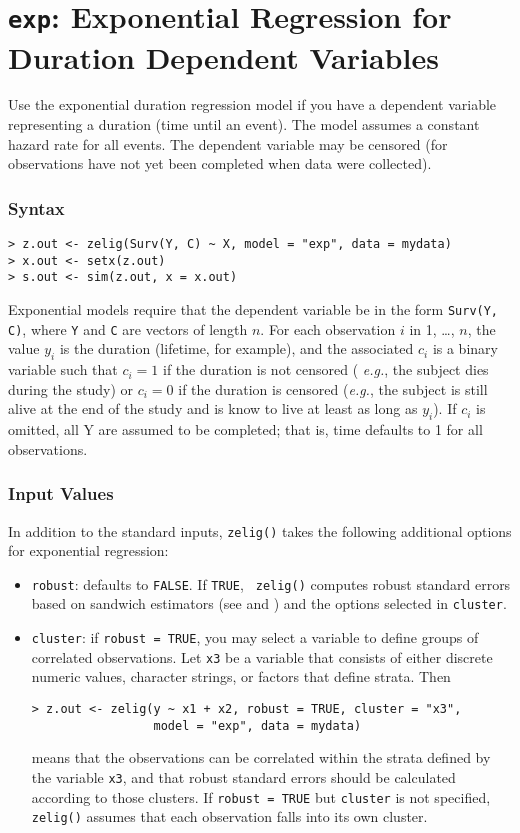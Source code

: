 \section{{\tt exp}: Exponential Regression for Duration
Dependent Variables}\label{exp}

Use the exponential duration regression model if you have a dependent
variable representing a duration (time until an event).  The model
assumes a constant hazard rate for all events.  The dependent variable
may be censored (for observations have not yet been completed when
data were collected).

\subsubsection{Syntax}

\begin{verbatim}
> z.out <- zelig(Surv(Y, C) ~ X, model = "exp", data = mydata)
> x.out <- setx(z.out)
> s.out <- sim(z.out, x = x.out)
\end{verbatim}
Exponential models require that the dependent variable be in the form
{\tt Surv(Y, C)}, where {\tt Y} and {\tt C} are vectors of length $n$.
For each observation $i$ in 1, \dots, $n$, the value $y_i$ is the
duration (lifetime, for example), and the associated $c_i$ is a binary
variable such that $c_i = 1$ if the duration is not censored ({\it
  e.g.}, the subject dies during the study) or $c_i = 0$ if the
duration is censored ({\it e.g.}, the subject is still alive at the
end of the study and is know to live at least as long as $y_i$).  If
$c_i$ is omitted, all Y are assumed to be completed; that is, time
defaults to 1 for all observations.

\subsubsection{Input Values} 

In addition to the standard inputs, {\tt zelig()} takes the following
additional options for exponential regression:  
\begin{itemize}
\item {\tt robust}: defaults to {\tt FALSE}.  If {\tt TRUE}, {\tt
zelig()} computes robust standard errors based on sandwich estimators
(see \cite{Huber81} and \cite{White80}) and the options selected in
{\tt cluster}.
\item {\tt cluster}:  if {\tt robust = TRUE}, you may select a
variable to define groups of correlated observations.  Let {\tt x3} be
a variable that consists of either discrete numeric values, character
strings, or factors that define strata.  Then
\begin{verbatim}
> z.out <- zelig(y ~ x1 + x2, robust = TRUE, cluster = "x3", 
                 model = "exp", data = mydata)
\end{verbatim}
means that the observations can be correlated within the strata defined by
the variable {\tt x3}, and that robust standard errors should be
calculated according to those clusters.  If {\tt robust = TRUE} but
{\tt cluster} is not specified, {\tt zelig()} assumes that each
observation falls into its own cluster.  
\end{itemize}  

